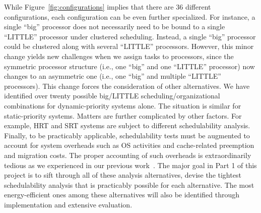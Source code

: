 

While  Figure~\ref{fig:configurations} implies that there are 36 different configurations, each configuration can be even further specialized. For instance, a single ``big'' processor does not necessarily need to be bound to a single ``LITTLE'' processor under clustered scheduling. Instead, a single ``big'' processor could be clustered along with several ``LITTLE'' processors. However, this minor change yields new challenges when we assign tasks to processors, since the symmetric processor structure (i.e., one ``big'' and one ``LITTLE'' processor) now changes to an asymmetric one (i.e., one ``big'' and multiple ``LITTLE'' processors). This change forces the consideration of other alternatives. We have identified over twenty possible big/LITTLE scheduling/organizational combinations for dynamic-priority systems alone. The situation is similar for static-priority systems. Matters are further complicated by other factors. For example, HRT and SRT systems are subject to different schedulability analysis. Finally, to be practicably applicable, schedulability tests must be augmented to account for system overheads such as OS activities and cache-related preemption and migration costs. %
 The proper accounting of such overheads is extraordinarily tedious as we experienced in our previous work~\cite{Liudissertation, elliott1minimizing}. The major goal in Part 1 of this project is to sift through all of these analysis alternatives, devise the tightest schedulability analysis that is practicably possible for each alternative. The most energy-efficient ones among these alternatives will also be identified through implementation and extensive evaluation. %



